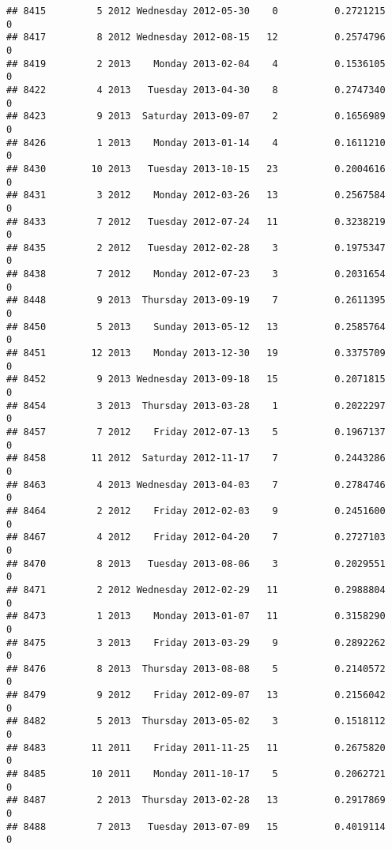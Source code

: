 \documentclass[
]{article}
\begin{document}
\begin{verbatim}
## 8415         5 2012 Wednesday 2012-05-30    0          0.2721215             0
## 8417         8 2012 Wednesday 2012-08-15   12          0.2574796             0
## 8419         2 2013    Monday 2013-02-04    4          0.1536105             0
## 8422         4 2013   Tuesday 2013-04-30    8          0.2747340             0
## 8423         9 2013  Saturday 2013-09-07    2          0.1656989             0
## 8426         1 2013    Monday 2013-01-14    4          0.1611210             0
## 8430        10 2013   Tuesday 2013-10-15   23          0.2004616             0
## 8431         3 2012    Monday 2012-03-26   13          0.2567584             0
## 8433         7 2012   Tuesday 2012-07-24   11          0.3238219             0
## 8435         2 2012   Tuesday 2012-02-28    3          0.1975347             0
## 8438         7 2012    Monday 2012-07-23    3          0.2031654             0
## 8448         9 2013  Thursday 2013-09-19    7          0.2611395             0
## 8450         5 2013    Sunday 2013-05-12   13          0.2585764             0
## 8451        12 2013    Monday 2013-12-30   19          0.3375709             0
## 8452         9 2013 Wednesday 2013-09-18   15          0.2071815             0
## 8454         3 2013  Thursday 2013-03-28    1          0.2022297             0
## 8457         7 2012    Friday 2012-07-13    5          0.1967137             0
## 8458        11 2012  Saturday 2012-11-17    7          0.2443286             0
## 8463         4 2013 Wednesday 2013-04-03    7          0.2784746             0
## 8464         2 2012    Friday 2012-02-03    9          0.2451600             0
## 8467         4 2012    Friday 2012-04-20    7          0.2727103             0
## 8470         8 2013   Tuesday 2013-08-06    3          0.2029551             0
## 8471         2 2012 Wednesday 2012-02-29   11          0.2988804             0
## 8473         1 2013    Monday 2013-01-07   11          0.3158290             0
## 8475         3 2013    Friday 2013-03-29    9          0.2892262             0
## 8476         8 2013  Thursday 2013-08-08    5          0.2140572             0
## 8479         9 2012    Friday 2012-09-07   13          0.2156042             0
## 8482         5 2013  Thursday 2013-05-02    3          0.1518112             0
## 8483        11 2011    Friday 2011-11-25   11          0.2675820             0
## 8485        10 2011    Monday 2011-10-17    5          0.2062721             0
## 8487         2 2013  Thursday 2013-02-28   13          0.2917869             0
## 8488         7 2013   Tuesday 2013-07-09   15          0.4019114             0

\end{verbatim}
\end{document}
